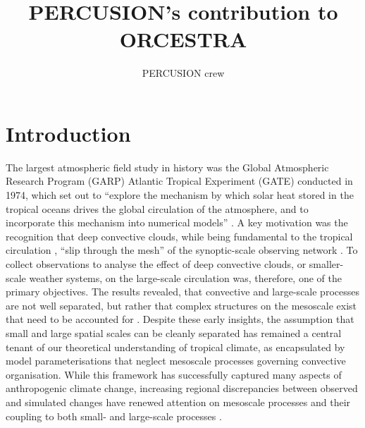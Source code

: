 \documentclass{article}
\title{PERCUSION’s contribution to ORCESTRA}
\author{PERCUSION crew}
\begin{document}
\maketitle

\begin{abstract}

\end{abstract}


\section{Introduction}


The largest atmospheric field study in history \citep{zhangRelocationGATEPacific2022} was the Global Atmospheric Research Program (GARP) Atlantic Tropical Experiment (GATE) conducted in 1974, which set out to ``explore the mechanism by which solar heat stored in the tropical oceans drives the global circulation of the atmosphere, and to incorporate this mechanism into numerical models'' \citep{kuettnerGeneralDescriptionCentral1974}. 
A key motivation was the recognition that deep convective clouds, while being fundamental to the tropical circulation \citep{riehlHeatBalanceEquatorial1958}, ``slip through the mesh'' of the synoptic-scale observing network \citep{kuettnerGeneralDescriptionCentral1974}.
To collect observations to analyse the effect of deep convective clouds, or smaller-scale weather systems, on the large-scale circulation was, therefore, one of the primary objectives. 
The results revealed, that convective and large-scale processes are not well separated, but rather that complex structures on the mesoscale exist that need to be accounted for \citep{houzejr.ConvectionGATE1981}.
Despite these early insights, the assumption that small and large spatial scales can be cleanly separated has remained a central tenant of our theoretical understanding of tropical climate, as encapsulated by model parameterisations that neglect mesoscale processes governing convective organisation.
While this framework has successfully captured many aspects of anthropogenic climate change, increasing regional discrepancies between observed and simulated changes have renewed attention on mesoscale processes and their coupling to both small- and large-scale processes \citep{shawOtherClimateCrisis2025}.
\end{document}
